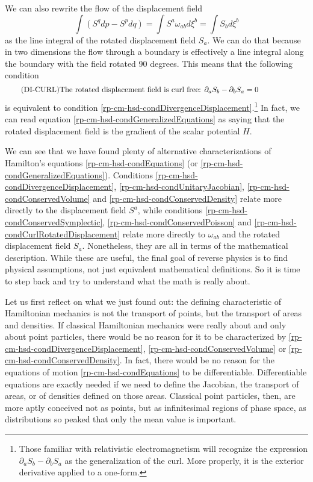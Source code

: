 We can also rewrite the flow of the displacement field
\begin{equation}
	\int \left( S^q dp - S^p dq \right) = \int S^a \omega_{ab} d\xi^b = \int S_b d\xi^b
\end{equation}
as the line integral of the rotated displacement field $S_a$. We can do that because in two dimensions the flow through a boundary is effectively a line integral along the boundary with the field rotated 90 degrees. This means that the following condition
\begin{equation}\label{rp-cm-hsd-condCurlRotatedDisplacement}
	\tag{DI-CURL}
	\eqtext{The rotated displacement field is curl free: $\partial_a S_b - \partial_b S_a = 0$} 
\end{equation}
is equivalent to condition \ref{rp-cm-hsd-condDivergenceDisplacement}.\footnote{Those familiar with relativistic electromagnetism will recognize the expression $\partial_a S_b - \partial_b S_a$ as the generalization of the curl. More properly, it is the exterior derivative applied to a one-form.} In fact, we can read equation \ref{rp-cm-hsd-condGeneralizedEquations} as saying that the rotated displacement field is the gradient of the scalar potential $H$.

We can see that we have found plenty of alternative characterizations of Hamilton's equations \ref{rp-cm-hsd-condEquations} (or \ref{rp-cm-hsd-condGeneralizedEquations}). Conditions  \ref{rp-cm-hsd-condDivergenceDisplacement}, \ref{rp-cm-hsd-condUnitaryJacobian}, \ref{rp-cm-hsd-condConservedVolume} and \ref{rp-cm-hsd-condConservedDensity} relate more directly to the displacement field $S^a$, while conditions \ref{rp-cm-hsd-condConservedSymplectic}, \ref{rp-cm-hsd-condConservedPoisson} and \ref{rp-cm-hsd-condCurlRotatedDisplacement} relate more directly to $\omega_{ab}$ and the rotated displacement field $S_a$. Nonetheless, they are all in terms of the mathematical description. While these are useful, the final goal of reverse physics is to find physical assumptions, not just equivalent mathematical definitions. So it is time to step back and try to understand what the math is really about.

Let us first reflect on what we just found out: the defining characteristic of Hamiltonian mechanics is not the transport of points, but the transport of areas and densities. If classical Hamiltonian mechanics were really about and only about point particles, there would be no reason for it to be characterized by \ref{rp-cm-hsd-condDivergenceDisplacement}, \ref{rp-cm-hsd-condConservedVolume} or \ref{rp-cm-hsd-condConservedDensity}. In fact, there would be no reason for the equations of motion \ref{rp-cm-hsd-condEquations} to be differentiable. Differentiable equations are exactly needed if we need to define the Jacobian, the transport of areas, or of densities defined on those areas. Classical point particles, then, are more aptly conceived not as points, but as infinitesimal regions of phase space, as distributions so peaked that only the mean value is important.

